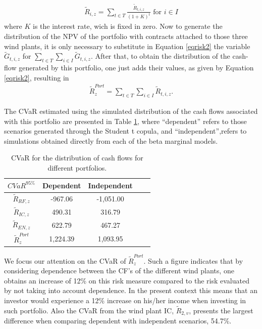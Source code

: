 \documentclass[a4paper]{IEEEtran}
\begin{document}
\begin{eqnarray}
\tilde{R}_{i,z}=\sum_{t\in T}{\frac{\tilde{R}_{t,i,z}}{(1+K)^{t}}}\,\, \mbox{for} \,\, i\in I
\end{eqnarray}
where $K$ is the interest rate, wich is fixed in zero. Now to generate the distribution of the NPV of the portfolio with contracts attached to those three wind plants, it is only necessary to substitute in Equation \eqref{eqrisk2} the variable $\tilde{G}_{t,i,z}$ for $\sum_{t\in T}{\sum_{i\in I}{\tilde{G}}_{t,i,z}}$. After that, to obtain the  distribution of the cash-flow generated by this portfolio, one just adds their values, as given by Equation \eqref{eqrisk2}, resulting in
\begin{eqnarray}
\tilde{R}_{z}^{Port}=\sum_{t\in T}{\sum_{i\in I}{\tilde{R}_{t,i,z}}}.
\end{eqnarray}

The CVaR estimated using the simulated distribution of the cash flows associated with this portfolio are presented in Table \ref{CVar_rendas}, where ``dependent'' refers to those scenarios generated through the Student t copula, and ``independent'',refers to simulations obtained directly from each of the beta marginal models.
 \begin{table}%
 \centering
 \caption{CVaR for the distribution of cash flows for different portfolios.}
 \begin{tabular}{|c|c|c|c|c|}
 \hline
 {$CVaR^{95\%}$} & Dependent & Independent \\ \hline
 $\tilde{R}_{RF,z}$ & -967.06 & -1,051.00 \\ \hline
 $\tilde{R}_{IC,z}$ & 490.31 & 316.79 \\ \hline
 $\tilde{R}_{EN,z}$ & 622.79 & 467.27 \\ \hline
 $\tilde{R}_{z}^{Port}$ & 1,224.39 & 1,093.95 \\ \hline
 \end{tabular}%
 \label{CVar_rendas}%
 \end{table}%

We focus our attention on the CVaR of $\tilde{R}_{z}^{Port}$. Such a figure indicates that by considering dependence between the CF's of the different wind plants, one obtains an increase of 12\% on this risk measure compared to the risk evaluated by not taking into account dependence. In the present context this means that an investor would experience a 12\% increase on his/her income when investing in such portfolio. Also the CVaR from the wind plant IC, $\tilde{R}_{2,v}$, presents the largest difference when comparing dependent with independent scenarios, 54.7\%. %
\end{document}

